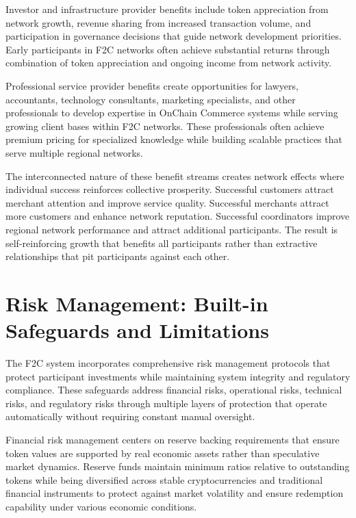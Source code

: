 \documentclass[
  Letterpaper,
]{scrbook}
\begin{document}
Investor and infrastructure provider benefits include token appreciation
from network growth, revenue sharing from increased transaction volume,
and participation in governance decisions that guide network development
priorities. Early participants in F2C networks often achieve substantial
returns through combination of token appreciation and ongoing income
from network activity.

Professional service provider benefits create opportunities for lawyers,
accountants, technology consultants, marketing specialists, and other
professionals to develop expertise in OnChain Commerce systems while
serving growing client bases within F2C networks. These professionals
often achieve premium pricing for specialized knowledge while building
scalable practices that serve multiple regional networks.

The interconnected nature of these benefit streams creates network
effects where individual success reinforces collective prosperity.
Successful customers attract merchant attention and improve service
quality. Successful merchants attract more customers and enhance network
reputation. Successful coordinators improve regional network performance
and attract additional participants. The result is self-reinforcing
growth that benefits all participants rather than extractive
relationships that pit participants against each other.

\section{Risk Management: Built-in Safeguards and
Limitations}\label{risk-management-built-in-safeguards-and-limitations}

The F2C system incorporates comprehensive risk management protocols that
protect participant investments while maintaining system integrity and
regulatory compliance. These safeguards address financial risks,
operational risks, technical risks, and regulatory risks through
multiple layers of protection that operate automatically without
requiring constant manual oversight.

Financial risk management centers on reserve backing requirements that
ensure token values are supported by real economic assets rather than
speculative market dynamics. Reserve funds maintain minimum ratios
relative to outstanding tokens while being diversified across stable
cryptocurrencies and traditional financial instruments to protect
against market volatility and ensure redemption capability under various
economic conditions.
\end{document}
